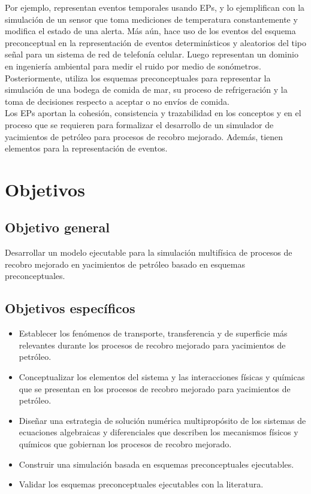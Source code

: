 Por ejemplo, \cite{norena2018timrep} representan eventos temporales usando EPs, y lo ejemplifican con la simulación de un sensor que toma mediciones de temperatura constantemente y modifica el estado de una alerta. Más aún, \cite{norena2018det} hace uso de los eventos del esquema preconceptual en la representación de eventos determinísticos y aleatorios del tipo señal para un sistema de red de telefonía celular. Luego \cite{norena2018ruido} representan un dominio en ingeniería ambiental para medir el ruido por medio de sonómetros. Posteriormente, \cite{norena2018bs} utiliza los esquemas preconceptuales para representar la simulación de una bodega de comida de mar, su proceso de refrigeración y la toma de decisiones respecto a aceptar o no envíos de comida.\\

Los EPs aportan la cohesión, consistencia y trazabilidad en los conceptos y en el proceso que se requieren para formalizar el desarrollo de un simulador de yacimientos de petróleo para procesos de recobro mejorado. Además, tienen elementos para la representación de eventos. %

\section{Objetivos}
\subsection{Objetivo general}
Desarrollar un modelo ejecutable para la simulación multifísica de procesos de recobro mejorado en yacimientos de petróleo basado en esquemas preconceptuales.
\subsection{Objetivos específicos}
\begin{itemize}
	\item Establecer los fenómenos de transporte, transferencia y de superficie más relevantes durante los procesos de recobro mejorado para yacimientos de petróleo.
	\item Conceptualizar los elementos del sistema y las interacciones físicas y químicas que se presentan en los procesos de recobro mejorado para yacimientos de petróleo.
	\item Diseñar una estrategia de solución numérica multipropósito de los sistemas de ecuaciones algebraicas y diferenciales que describen los mecanismos físicos y químicos que gobiernan los procesos de recobro mejorado.
	\item Construir una simulación basada en esquemas preconceptuales ejecutables.
	\item Validar los esquemas preconceptuales ejecutables con la literatura.
\end{itemize}
